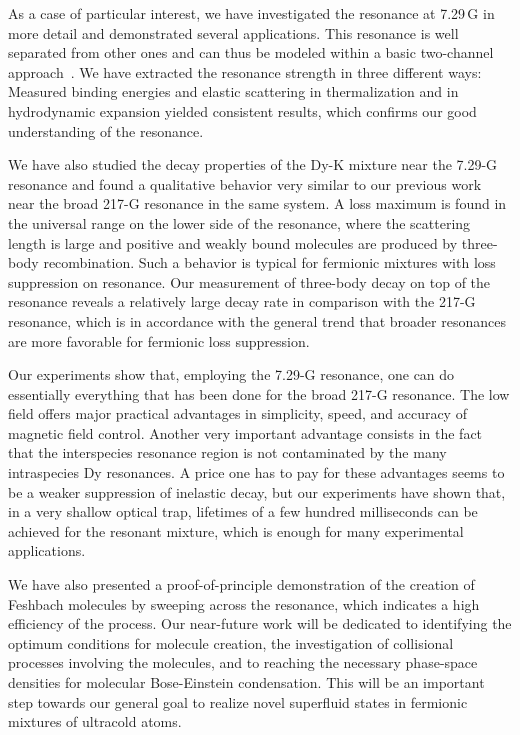 As a case of particular interest, we have investigated the resonance at 7.29\,G in more detail and demonstrated several applications. This resonance is well separated from other ones and can thus be modeled within a basic two-channel approach~\cite{Petrov2004tbp}. We have extracted the resonance strength in three different ways: Measured binding energies and elastic scattering in thermalization and in hydrodynamic expansion yielded consistent results, which confirms our good understanding of the resonance.

We have also studied the decay properties of the Dy-K mixture near the 7.29-G resonance and found a qualitative behavior very similar to our previous work~\cite{Ravensbergen2020rif} near the broad 217-G resonance in the same system. A loss maximum is found in the universal range on the lower side of the resonance, where the scattering length is large and positive and weakly bound molecules are produced by three-body recombination. Such a behavior is typical for fermionic mixtures with loss suppression on resonance.
Our measurement of three-body decay on top of the resonance reveals a relatively large decay rate in comparison with the 217-G resonance, which is in accordance with the general trend that broader resonances are more favorable for fermionic loss suppression.

Our experiments show that, employing the 7.29-G resonance, one can do essentially everything that has been done for the broad 217-G resonance. The low field offers major practical advantages in simplicity, speed, and accuracy of magnetic field control. Another very important advantage consists in the fact that the interspecies resonance region is not contaminated by the many intraspecies Dy resonances. A price one has to pay for these advantages seems to be a weaker suppression of inelastic decay, but our experiments have shown that, in a very shallow optical trap, lifetimes of a few hundred milliseconds can be achieved for the resonant mixture, which is enough for many experimental applications.

We have also presented a proof-of-principle demonstration of the creation of Feshbach molecules by sweeping across the resonance, which indicates a high efficiency of the process. Our near-future work will be dedicated to identifying the optimum conditions for molecule creation, the investigation of collisional processes involving the molecules, and to reaching the necessary phase-space densities for molecular Bose-Einstein condensation. This will be an important step towards our general goal to realize novel superfluid states in fermionic mixtures of ultracold atoms.

